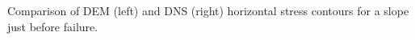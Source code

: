 \label{fig:S11DNS} Comparison of DEM (left) and DNS (right) horizontal stress contours for a slope just before failure.  